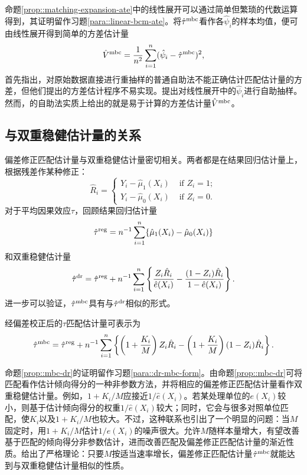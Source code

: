  
 
命题\ref{prop::matching-expansion-ate}中的线性展开可以通过简单但繁琐的代数运算得到，其证明留作习题\ref{para::linear-bcm-ate}。将$\hat{\tau}^\textup{mbc}  $看作各$  \hat{\psi}_i $的样本均值，便可由线性展开得到简单的方差估计量$$
\hat{V}^\textup{mbc}  = \frac{1}{n^2} \sum_{i=1}^n (  \hat{\psi}_i - \hat{\tau}^\textup{mbc}  )^2,
$$\citet{abadie2008failure}首先指出，对原始数据直接进行重抽样的普通自助法不能正确估计匹配估计量的方差，但他们提出的方差估计程序不易实现。\citet{otsu2017bootstrap}提出对线性展开中的$  \hat{\psi}_i $进行自助抽样。然而，\citet{otsu2017bootstrap}的自助法实质上给出的就是易于计算的方差估计量$\hat{V}^\textup{mbc}  $。 


 
\subsection{与双重稳健估计量的关系}
 \label{sec::connection-dr-att}
 
偏差修正匹配估计量与双重稳健估计量密切相关。两者都是在结果回归估计量上，根据残差作某种修正：$$ 
 \hat{R}_i = 
 \begin{cases}
 Y_i - \hat{\mu}_1(X_i)  & \text{ if } Z_i=1;\\
 Y_i - \hat{\mu}_0(X_i)    & \text{ if } Z_i=0.
\end{cases} 
 $$对于平均因果效应$\tau$，回顾结果回归估计量$$
\hat{\tau}^{\textup{reg}} =  n^{-1} \sum_{i=1}^n \{ \hat{\mu}_1(X_i) -  \hat{\mu}_0(X_i)\} 
$$和双重稳健估计量$$
\hat{\tau}^\textup{dr}  =  \hat{\tau}^{\textup{reg}} 
+ n^{-1} \sum_{i=1}^n \left\{  \frac{Z_i \hat{R}_i }{ \hat{e}(X_i)} -  \frac{ (1-Z_i) \hat{R}_i}{ 1-  \hat{e}(X_i) } \right\} .
$$进一步可以验证，$\hat{\tau}^\textup{mbc} $具有与$\hat{\tau}^\textup{dr}  $相似的形式。
\begin{proposition}
\label{prop::mbc-dr}
经偏差校正后的$\tau$匹配估计量可表示为
$$
\hat{\tau}^\textup{mbc}   =\hat{\tau}^{\textup{reg}} 
+ n^{-1} \sum_{i=1}^n \left\{ \left(1+{ K_i\over M} \right)  Z_i \hat{R}_i  - \left( 1+{ K_i\over M} \right) (1-Z_i)  \hat{R}_i \right\} .
$$
\end{proposition}

命题\ref{prop::mbc-dr}的证明留作习题\ref{para::dr-mbc-form}。由命题\ref{prop::mbc-dr}可将匹配看作估计倾向得分的一种非参数方法，并将相应的偏差修正匹配估计量看作双重稳健估计量。例如，$1+K_i /  M$应接近$1/\hat{e}(X_i)$。若某处理单位的$e(X_i)$较小，则基于估计倾向得分的权重$1/\hat{e}(X_i)$较大；同时，它会与很多对照单位匹配，使$K_i$以及$1+K_i /  M$也较大。不过，这种联系也引出了一个明显的问题：当$M$固定时，用$1+K_i /  M$估计$1/e(X_i)$的噪声很大。允许$M$随样本量增大，有望改善基于匹配的倾向得分非参数估计，进而改善匹配及偏差修正匹配估计量的渐近性质。\citet{lin2023estimation}给出了严格理论：只要$M$按适当速率增长，偏差修正匹配估计量$\hat{\tau}^\textup{mbc}   $就能达到与双重稳健估计量相似的性质。  


